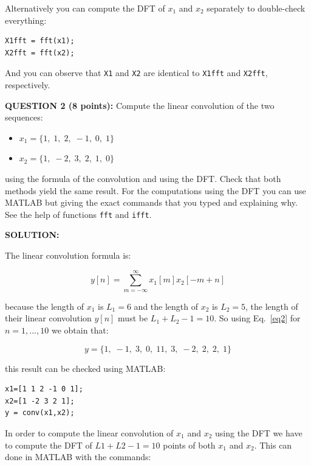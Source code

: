 \documentclass[a4paper,11pt,oneside]{article}
\begin{document}
Alternatively you can compute the DFT of $x_1$ and $x_2$ separately to double-check everything:

\begin{verbatim}
X1fft = fft(x1);
X2fft = fft(x2);
\end{verbatim}

And you can observe that \verb|X1| and \verb|X2|  are identical to \verb|X1fft| and  \verb|X2fft|, respectively.

\vspace{2cm}

\textbf{QUESTION 2 (8 points):} Compute the linear convolution of the two sequences:

\begin{itemize}
\item[] $x_{1}=\{1,\; 1,\; 2,\; -1,\; 0,\; 1\}$
\item[] $x_{2}=\{1,\;-2,\; 3,\; 2,\; 1,\; 0\}$
\end{itemize}

\noindent using the formula of the convolution and using the DFT. Check that both methods yield the same result. For the computations using the DFT you can use MATLAB but giving the exact commands that you typed and explaining why. See the help of functions \verb|fft| and \verb|ifft|.

\vspace{1cm}

\textbf{SOLUTION:}

The linear convolution formula is:

\begin{equation} \label{eq2}
y[n] = \sum_{m=-\infty}^{\infty}x_1[m]x_2[-m+n]
\end{equation}

because the length of $x_1$ is $L_1=6$ and the length of $x_2$ is $L_2=5$, the length of their linear convolution $y[n]$ must be $L_1+L_2-1=10$. So using Eq.~\ref{eq2} for $n=1,...,10$ we obtain that:

\[
y=\{1,\;-1,\;     3,\;     0,\;    11,\;     3,\;    -2,\;     2,\;     2,\;     1\}
\]

this result can be checked using MATLAB:

\begin{verbatim}
x1=[1 1 2 -1 0 1];
x2=[1 -2 3 2 1];
y = conv(x1,x2);
\end{verbatim}

In order to compute the linear convolution of $x_1$ and $x_2$ using the DFT we have to compute the DFT of $L1+L2-1=10$ points of both $x_1$ and $x_2$. This can done in MATLAB with the commands:
\end{document}
